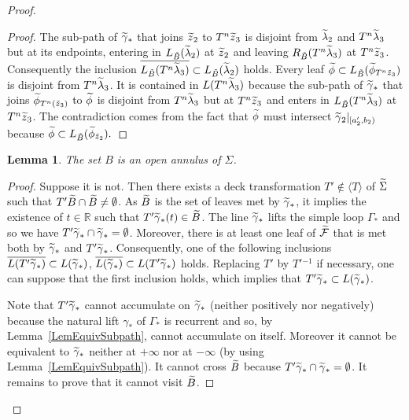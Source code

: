 \documentclass[10pt,a4paper]{article}
\newtheorem{lemm}[prop]{Lemma}
\theoremstyle{definition}
\theoremstyle{plain}
\numberwithin{equation}{section}
\numberwithin{figure}{section}
\newcommand{\R}{\mathbb{R}}
\newcommand{\F}{\mathcal{F}}
\let\oldtilde\tilde
\renewcommand*{\tilde}[1]{\mathchoice{\widetilde{#1}}{\widetilde{#1}}{\oldtilde{#1}}{\oldtilde{#1}}}
\begin{document}
\begin{proof}
\begin{proof}
The sub-path of $\tilde\gamma_*$ that joins $\tilde z_2$ to $T^n\tilde z_3$ is disjoint from $\tilde\lambda_2$ and $T^n\tilde\lambda_3$ but at its endpoints, entering in $L_{\tilde B}(\tilde\lambda_2)$ at $\tilde z_2$ and leaving $R_{\tilde B}(T^n\tilde\lambda_3)$ at $T^n\tilde z_3$. Consequently the inclusion $\overline{L_{\tilde B}(T^n\tilde\lambda_3)}\subset L_{\tilde B}(\tilde\lambda_2)$ holds. Every leaf $\tilde\phi\subset L_{\tilde B}(\tilde\phi_{T^n\tilde z_3})$ is disjoint from $T^n\tilde\lambda_3$. It is contained in $L(T^n\tilde\lambda_3)$ because the sub-path of $\tilde\gamma_*$ that joins $\tilde\phi_{T^n(\tilde z_3)}$ to $\tilde\phi$ is disjoint from $T^n\tilde\lambda_3$ but at $T^n\tilde z_3$ and enters in $L_{\tilde B}(T^n\tilde\lambda_3)$ at $T^n\tilde z_3$. The contradiction comes from the fact that $\tilde \phi$ must intersect $\tilde\gamma_2\vert_{[a'_2,b_2)}$ because $\tilde\phi\subset L_{\tilde B}(\tilde\phi_{\tilde z_2}).$
\end{proof}

\begin{lemm}\label{Lem:ProjAnnulus}
The set $B$ is an open annulus of $\Sigma$.
\end{lemm}

\begin{proof}
Suppose it is not. Then there exists a deck transformation $T'\notin\langle T\rangle$ of $\tilde\Sigma$ such that $T'\tilde B\cap \tilde B\neq \emptyset$. As $\tilde B$ is the set of leaves met by $\tilde\gamma_*$, it implies the existence of $t\in\R$ such that $T'\tilde\gamma_*(t) \in \tilde B$. The line $\tilde\gamma_*$ lifts the simple loop $\Gamma_*$ and so we have $T'\tilde\gamma_*\cap \tilde\gamma_*=\emptyset$. Moreover, there is at least one leaf of $\tilde{\F}$ that is met both by $\tilde\gamma_*$ and $T'\tilde\gamma_*$. Consequently, one of the following inclusions $\overline{L(T'\tilde\gamma_*)}\subset L(\tilde\gamma_*)$, $\overline{L(\tilde\gamma_*)}\subset L(T'\tilde\gamma_*)$ holds. Replacing $T'$ by $T'{}^{-1}$ if necessary, one can suppose that the first inclusion holds, which implies that $T'\tilde\gamma_*\subset L(\tilde\gamma_*)$.

Note that $T'\tilde\gamma_*$ cannot accumulate on $\tilde\gamma_*$ (neither positively nor negatively) because the natural lift $\gamma_*$ of $\Gamma_*$ is recurrent and so, by Lemma~\ref{LemEquivSubpath}, cannot accumulate on itself. Moreover it cannot be equivalent to $\tilde\gamma_*$ neither at $+\infty$ nor at $-\infty$ (by using Lemma~\ref{LemEquivSubpath}). It cannot cross $\tilde B$ because $T'\tilde\gamma_*\cap \tilde\gamma_*=\emptyset$. It remains to prove that it cannot visit $\tilde B$.


\end{proof}
\end{proof}
\end{document}

